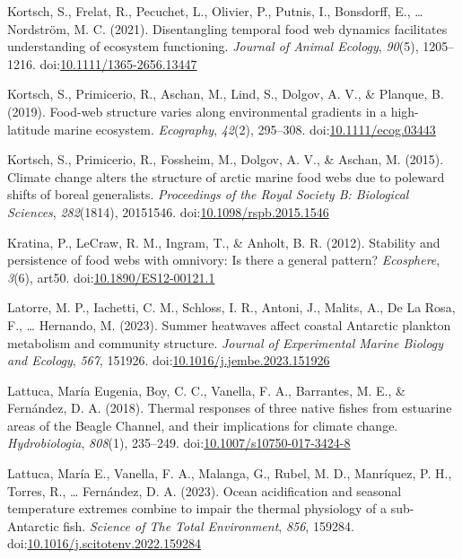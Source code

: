 \documentclass[
]{article}
\newlength{\cslhangindent}
\newlength{\cslentryspacingunit} %
\newenvironment{CSLReferences}[2] %
 {%
  \setlength{\parindent}{0pt}
  \ifodd #1
  \let\oldpar\par
  \def\par{\hangindent=\cslhangindent\oldpar}
  \fi
  \setlength{\parskip}{#2\cslentryspacingunit}
 }%
 {}
\begin{document}
\begin{CSLReferences}{1}{0}
\leavevmode{}%
Kortsch, S., Frelat, R., Pecuchet, L., Olivier, P., Putnis, I.,
Bonsdorff, E., \ldots{} Nordström, M. C. (2021). Disentangling temporal
food web dynamics facilitates understanding of ecosystem functioning.
\emph{Journal of Animal Ecology}, \emph{90}(5), 1205--1216.
doi:\href{https://doi.org/10.1111/1365-2656.13447}{10.1111/1365-2656.13447}

\leavevmode{}%
Kortsch, S., Primicerio, R., Aschan, M., Lind, S., Dolgov, A. V., \&
Planque, B. (2019). Food-web structure varies along environmental
gradients in a high-latitude marine ecosystem. \emph{Ecography},
\emph{42}(2), 295--308.
doi:\href{https://doi.org/10.1111/ecog.03443}{10.1111/ecog.03443}

\leavevmode{}%
Kortsch, S., Primicerio, R., Fossheim, M., Dolgov, A. V., \& Aschan, M.
(2015). Climate change alters the structure of arctic marine food webs
due to poleward shifts of boreal generalists. \emph{Proceedings of the
Royal Society B: Biological Sciences}, \emph{282}(1814), 20151546.
doi:\href{https://doi.org/10.1098/rspb.2015.1546}{10.1098/rspb.2015.1546}

\leavevmode{}%
Kratina, P., LeCraw, R. M., Ingram, T., \& Anholt, B. R. (2012).
Stability and persistence of food webs with omnivory: {Is} there a
general pattern? \emph{Ecosphere}, \emph{3}(6), art50.
doi:\href{https://doi.org/10.1890/ES12-00121.1}{10.1890/ES12-00121.1}

\leavevmode{}%
Latorre, M. P., Iachetti, C. M., Schloss, I. R., Antoni, J., Malits, A.,
De La Rosa, F., \ldots{} Hernando, M. (2023). Summer heatwaves affect
coastal {Antarctic} plankton metabolism and community structure.
\emph{Journal of Experimental Marine Biology and Ecology}, \emph{567},
151926.
doi:\href{https://doi.org/10.1016/j.jembe.2023.151926}{10.1016/j.jembe.2023.151926}

\leavevmode{}%
Lattuca, María Eugenia, Boy, C. C., Vanella, F. A., Barrantes, M. E., \&
Fernández, D. A. (2018). Thermal responses of three native fishes from
estuarine areas of the {Beagle Channel}, and their implications for
climate change. \emph{Hydrobiologia}, \emph{808}(1), 235--249.
doi:\href{https://doi.org/10.1007/s10750-017-3424-8}{10.1007/s10750-017-3424-8}

\leavevmode{}%
Lattuca, María E., Vanella, F. A., Malanga, G., Rubel, M. D., Manríquez,
P. H., Torres, R., \ldots{} Fernández, D. A. (2023). Ocean acidification
and seasonal temperature extremes combine to impair the thermal
physiology of a sub-{Antarctic} fish. \emph{Science of The Total
Environment}, \emph{856}, 159284.
doi:\href{https://doi.org/10.1016/j.scitotenv.2022.159284}{10.1016/j.scitotenv.2022.159284}


\end{CSLReferences}
\end{document}
